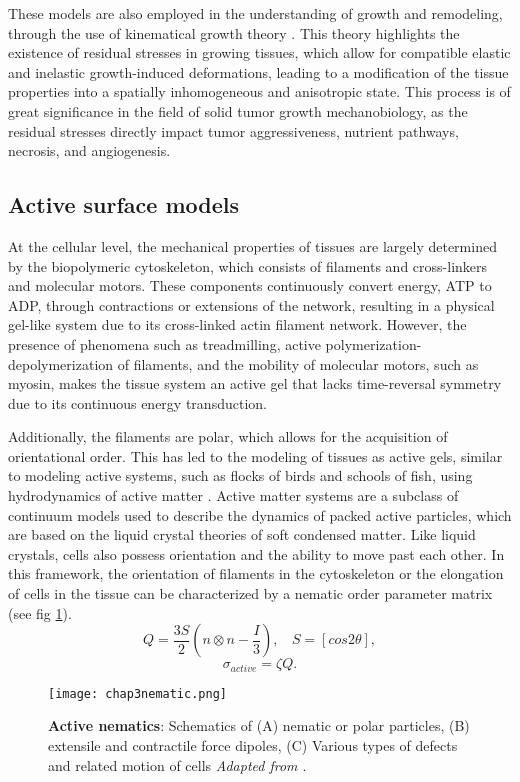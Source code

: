 These models are also employed in the understanding of growth and remodeling, through the use of kinematical growth theory \cite{ambrosi2019}. This theory highlights the existence of residual stresses in growing tissues, which allow for compatible elastic and inelastic growth-induced deformations, leading to a modification of the tissue properties into a spatially inhomogeneous and anisotropic state. This process is of great significance in the field of solid tumor growth mechanobiology, as the residual stresses directly impact tumor aggressiveness, nutrient pathways, necrosis, and angiogenesis.

\hypertarget{active-surface-models}{%
	\subsection{Active surface models}\label{active-surface-models}}

At the cellular level, the mechanical properties of tissues are largely determined by the biopolymeric cytoskeleton, which consists of filaments and cross-linkers and molecular motors. These components continuously convert energy, ATP to ADP, through contractions or extensions of the network, resulting in a physical gel-like system due to its cross-linked actin filament network. However, the presence of phenomena such as treadmilling, active polymerization-depolymerization of filaments, and the mobility of molecular motors, such as myosin, makes the tissue system an active gel that lacks time-reversal symmetry due to its continuous energy transduction.

Additionally, the filaments are polar, which allows for the acquisition of orientational order. This has led to the modeling of tissues as active gels, similar to modeling active systems, such as flocks of birds and schools of fish, using hydrodynamics of active matter \cite{julicher2018}. Active matter systems are a subclass of continuum models used to describe the dynamics of packed active particles, which are based on the liquid crystal theories of soft condensed matter. Like liquid crystals, cells also possess orientation and the ability to move past each other. In this framework, the orientation of filaments in the cytoskeleton or the elongation of cells in the tissue can be characterized by a nematic order parameter matrix (see fig \ref{fig_3_10}).
$$Q = \frac{3S}{2}\left(n\otimes n  -       \frac{I}{3}\right),\ \ \ \ S = [cos2\theta], $$
$$ \sigma_{active} = \zeta Q.$$

\begin{figure}[t]
	\centering
	\texttt{[image: chap3nematic.png]}
	\caption{\label{fig_3_10} \textbf{Active nematics}: Schematics of (A) nematic or polar particles, (B) extensile and contractile force dipoles, (C) Various types of defects and related motion of cells \textit{Adapted from \cite{xi2018}}. 
	}
\end{figure}

